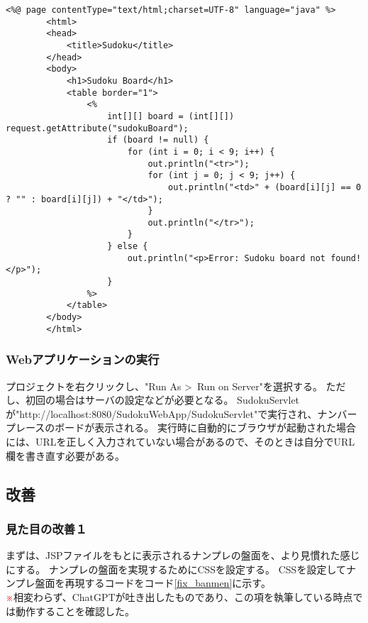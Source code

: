\documentclass[a4paper,10pt]{jsarticle}
\begin{document}
      \begin{lstlisting}[caption="sudoku.jsp"のコード例,label=sudoku_jsp]
        <%@ page contentType="text/html;charset=UTF-8" language="java" %>
        <html>
        <head>
            <title>Sudoku</title>
        </head>
        <body>
            <h1>Sudoku Board</h1>
            <table border="1">
                <%
                    int[][] board = (int[][]) request.getAttribute("sudokuBoard");
                    if (board != null) {
                        for (int i = 0; i < 9; i++) {
                            out.println("<tr>");
                            for (int j = 0; j < 9; j++) {
                                out.println("<td>" + (board[i][j] == 0 ? "" : board[i][j]) + "</td>");
                            }
                            out.println("</tr>");
                        }
                    } else {
                        out.println("<p>Error: Sudoku board not found!</p>");
                    }
                %>
            </table>
        </body>
        </html>
      \end{lstlisting}
    \subsubsection{Webアプリケーションの実行}
      プロジェクトを右クリックし、"Run As \textgreater \ Run on Server"を選択する。
      ただし、初回の場合はサーバの設定などが必要となる。
      SudokuServletが"http://localhost:8080/SudokuWebApp/SudokuServlet"で実行され、ナンバープレースのボードが表示される。
      実行時に自動的にブラウザが起動された場合には、URLを正しく入力されていない場合があるので、そのときは自分でURL欄を書き直す必要がある。
      
  \subsection{改善}
    \subsubsection{見た目の改善１}
      まずは、JSPファイルをもとに表示されるナンプレの盤面を、より見慣れた感じにする。
      ナンプレの盤面を実現するためにCSSを設定する。
      CSSを設定してナンプレ盤面を再現するコードをコード\ref{fix_banmen}に示す。\\
      \textcolor{red}{※}相変わらず、ChatGPTが吐き出したものであり、この項を執筆している時点では動作することを確認した。
\end{document}
